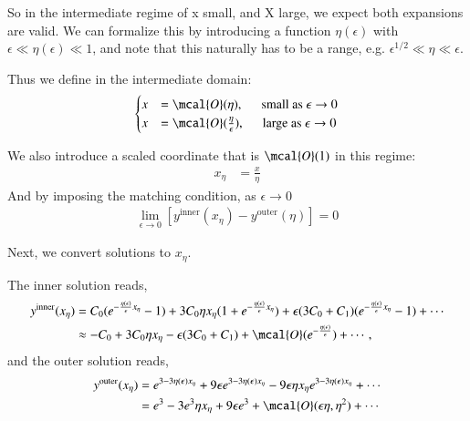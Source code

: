 \documentclass[a4paper, 12pt]{article}
\begin{document}
  So in the intermediate regime of x small, and X large, we expect both expansions
  are valid. We can formalize this by introducing a function \(
  \eta(\epsilon)   \) with \( \epsilon \ll \eta(\epsilon) \ll 1 \), and note
  that this naturally has to be a range, e.g. \( \epsilon^{1/2} \ll \eta
  \ll \epsilon \).

  Thus we define in the intermediate domain: 
  \begin{align}
    \label{intermediate domain Xes}
    \begin{cases} 
      x &= \mcal{O}(\eta), \hspace{0.5cm} \textnormal{small as } \epsilon
      \to 0 \\ 
      x &= \mcal{O}(\frac{\eta}{\epsilon}), \hspace{0.5cm}
      \textnormal{large as } \epsilon
      \to 0
    \end{cases}
  \end{align}

  We also introduce a scaled coordinate that is \( \mcal{O}(1) \) in this
  regime: 
  \begin{align}
    \label{intermediate x}
    x_{\eta} &= \frac{x}{\eta}
  \end{align}
  And by imposing the matching condition, as \( \epsilon \to 0 \) \begin{align}
    \label{intermediate matching}
    \lim_{\epsilon \to 0} [ y^{\mathrm{inner}}(x_{\eta}) -
    y^{\mathrm{outer}}(\eta)  ] = 0
  \end{align}

Next, we convert solutions to \( x_{\eta} \). 

The inner solution reads, 
\begin{align}
  \label{converting to inner y}
  y^{\mathrm{inner}}(x_{\eta}) &= C_0 ( e^{-
  \frac{\eta(\epsilon)}{\epsilon}x_{\eta}} - 1  ) + 3 C_0 \eta x_{\eta}
  ( 1 + e^{- \frac{\eta(\epsilon)}{\epsilon} x_{\eta}} ) + \epsilon
  (3 C_0 + C_1) ( e^{- \frac{\eta(\epsilon)}{\epsilon} x_{\eta}} -
  1) + \cdots \\ 
  &\approx -C_0 + 3C_0 \eta x_{\eta} - \epsilon (3 C_0 + C_1) + \mcal{O}(
  e^{- \frac{\eta(\epsilon)}{\epsilon}} ) + \cdots, 
\end{align}
and the outer solution reads, 
\begin{align}
  \label{converting to outer y}
  y^{\mathrm{outer}}(x_{\eta}) &= e^{3 - 3 \eta(\epsilon) x_{\eta}}
  + 9 \epsilon e^{3 - 3 \eta(\epsilon) x_{\eta}} - 9 \epsilon \eta
  x_{\eta} e^{3 - 3 \eta(\epsilon) x_{\eta}} + \cdots \\ 
  &= e^3 - 3 e^3 \eta x_{\eta} + 9 \epsilon e^3 + \mcal{O}(\epsilon
  \eta, \eta^2) + \cdots
\end{align}
\end{document}
